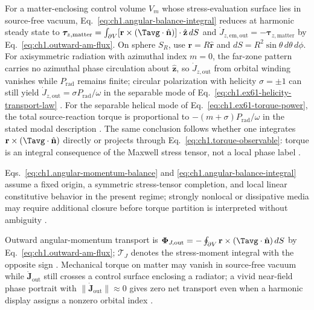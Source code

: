 For a matter-enclosing control volume $V_m$ whose stress-evaluation surface lies in source-free vacuum,
Eq.~\eqref{eq:ch1.angular-balance-integral} reduces at harmonic steady state to
\(\boldsymbol{\tau}_{z,\mathrm{matter}}=\int_{\partial V}[\mathbf{r}\times(\Tavg\cdot\hat{\mathbf{n}})]\cdot\hat{\mathbf{z}}\,dS\)
and \(\dot J_{z,\mathrm{em,out}}=-\boldsymbol{\tau}_{z,\mathrm{matter}}\) by Eq.~\eqref{eq:ch1.outward-am-flux}.
On sphere \(S_R\), use \(\mathbf{r}=R\hat{\mathbf{r}}\) and
\(dS=R^2\sin\theta\,d\theta\,d\phi\). For axisymmetric radiation with azimuthal index $m=0$, the far-zone pattern carries no azimuthal phase circulation about $\hat{\mathbf{z}}$, so $\dot J_{z,\mathrm{out}}$ from orbital winding vanishes while $P_{\mathrm{rad}}$ remains finite; circular polarization with helicity $\sigma=\pm1$ can still yield $\dot J_{z,\mathrm{out}}=\sigma P_{\mathrm{rad}}/\omega$ in the separable mode of Eq.~\eqref{eq:ch1.ex61-helicity-transport-law} \cite{beth1936,stratton1941}. For the separable helical mode of Eq.~\eqref{eq:ch1.ex61-torque-power}, the total source-reaction torque is proportional to $-(m+\sigma)P_{\mathrm{rad}}/\omega$ in the stated modal description \cite{stratton1941}.
The same conclusion follows whether one integrates $\mathbf{r}\times(\Tavg\cdot\hat{\mathbf{n}})$
directly or projects through Eq.~\eqref{eq:ch1.torque-observable}: torque is an integral consequence of the Maxwell stress tensor, not a local phase label
\cite{stratton1941}.

Eqs.~\eqref{eq:ch1.angular-momentum-balance}
and \eqref{eq:ch1.angular-balance-integral} assume a fixed origin, a symmetric
stress-tensor completion, and local linear constitutive behavior in the present
regime; strongly nonlocal or dissipative media may require additional closure before
torque partition is interpreted without ambiguity \cite{stratton1941}.

Outward angular-momentum transport is $\boldsymbol{\Phi}_{J,\mathrm{out}}=-\oint_{\partial V}\mathbf{r}\times(\Tavg\cdot\hat{\mathbf{n}})\,dS$ by Eq.~\eqref{eq:ch1.outward-am-flux}; $\boldsymbol{\mathcal{T}}_J$ denotes the stress-moment integral with the opposite sign \cite{beth1936,stratton1941}. Mechanical torque on matter may vanish in source-free vacuum while $\dot{\mathbf{J}}_{\mathrm{out}}$ still crosses a control surface enclosing a radiator; a vivid near-field phase portrait with $\|\dot{\mathbf{J}}_{\mathrm{out}}\|\approx 0$ gives zero net transport even when a harmonic display assigns a nonzero orbital index \cite{stratton1941}.

